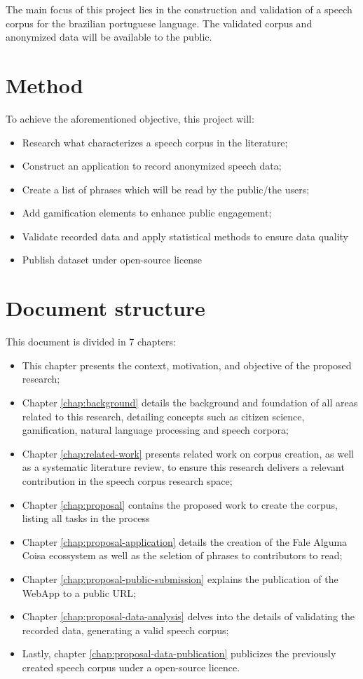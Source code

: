 The main focus of this project lies in the construction and validation of a speech corpus for the brazilian portuguese language. The validated corpus and anonymized data will be available to the public.

\section*{Method}

To achieve the aforementioned objective, this project will:

\begin{itemize}
    \item Research what characterizes a speech corpus in the literature;
    \item Construct an application to record anonymized speech data;
    \item Create a list of phrases which will be read by the public/the users;
    \item Add gamification elements to enhance public engagement;
    \item Validate recorded data and apply statistical methods to ensure data quality
    \item Publish dataset under open-source license
\end{itemize}

\section*{Document structure}

This document is divided in 7 chapters:

\begin{itemize}
    \item This chapter presents the context, motivation, and objective of the proposed research;
    \item Chapter \ref{chap:background} details the background and foundation of all areas related to this research, detailing concepts such as citizen science, gamification, natural language processing and speech corpora;
    \item Chapter \ref{chap:related-work} presents related work on corpus creation, as well as a systematic literature review, to ensure this research delivers a relevant contribution in the speech corpus research space;
    \item Chapter \ref{chap:proposal} contains the proposed work to create the corpus, listing all tasks in the process
    \item Chapter \ref{chap:proposal-application} details the creation of the Fale Alguma Coisa ecossystem as well as the seletion of phrases to contributors to read;
    \item Chapter \ref{chap:proposal-public-submission} explains the publication of the WebApp to a public URL;
    \item Chapter \ref{chap:proposal-data-analysis} delves into the details of validating the recorded data, generating a valid speech corpus;
    \item Lastly, chapter \ref{chap:proposal-data-publication} publicizes the previously created speech corpus under a open-source licence.
\end{itemize}
